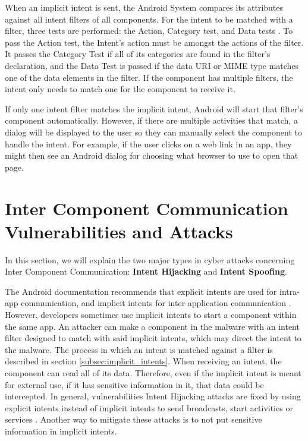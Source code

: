     When an implicit intent is sent, the Android System compares its attributes against all intent filters of all components. For the intent to be matched with a filter, three tests are performed: the Action, Category test, and Data tests \cite{intents_and_intent_filters}. To pass the Action test, the Intent’s action must be amongst the actions of the filter. It passes the Category Test if all of its categories are found in the filter’s declaration, and the Data Test is passed if the data URI or MIME type matches one of the data elements in the filter. If the component has multiple filters, the intent only needs to match one for the component to receive it.
    
    If only one intent filter matches the implicit intent, Android will start that filter’s component automatically. However, if there are multiple activities that match, a dialog will be displayed to the user so they can manually select the component to handle the intent. For example, if the user clicks on a web link in an app, they might then see an Android dialog for choosing what browser to use to open that page.
    
    \section{Inter Component Communication Vulnerabilities and Attacks}
        \label{sec:icc_vulnerabilities_and_attacks}
        
    In this section, we will explain the two major types in cyber attacks concerning Inter Component Communication: \textbf{Intent Hijacking} and \textbf{Intent Spoofing}.
        
    The Android documentation recommends that explicit intents are used for intra-app communication, and implicit intents for inter-application communication \cite{intents_and_intent_filters}. However, developers sometimes use implicit intents to start a component within the same app. An attacker can make a component in the malware with an intent filter designed to match with said implicit intents, which may direct the intent to the malware. The process in which an intent is matched against a filter is described in section \ref{subsec:implicit_intents}. When receiving an intent, the component can read all of its data. Therefore, even if the implicit intent is meant for external use, if it has sensitive information in it, that data could be intercepted. In general, vulnerabilities Intent Hijacking attacks are fixed by using explicit intents instead of implicit intents to send broadcasts, start activities or services \cite{2010_icc_paper}. Another way to mitigate these attacks is to not put sensitive information in implicit intents.
    
